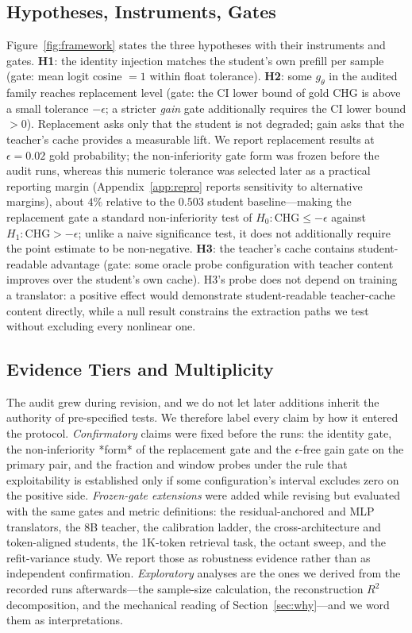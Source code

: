 \documentclass[10pt]{article}
\newcommand{\chg}{\mathrm{CHG}}
\begin{document}
\subsection{Hypotheses, Instruments, Gates}
Figure~\ref{fig:framework} states the three hypotheses with their instruments
and gates. \textbf{H1}: the identity injection matches the student's own
prefill per sample (gate: mean logit cosine $= 1$ within float tolerance).
\textbf{H2}: some $g_\theta$ in the audited family reaches replacement level
(gate: the CI lower bound of gold CHG is above a small tolerance $-\epsilon$; a
stricter \emph{gain} gate additionally requires the CI lower bound $> 0$).
Replacement asks only that the student is not degraded; gain asks that the
teacher's cache provides a measurable lift. We report replacement results at $\epsilon = 0.02$ gold probability; the non-inferiority gate form was frozen before the audit runs, whereas this numeric tolerance was selected later as a practical reporting margin (Appendix~\ref{app:repro} reports sensitivity to alternative margins), about $4\%$ relative to the $0.503$ student baseline---making the replacement gate a
standard non-inferiority test of $H_0\colon \chg \le -\epsilon$ against
$H_1\colon \chg > -\epsilon$; unlike a naive significance test, it does not
additionally require the point estimate to be non-negative. \textbf{H3}: the teacher's cache contains student-readable
advantage (gate: some oracle probe configuration with teacher content
improves over the student's own cache). H3's probe does not depend on training
a translator: a positive effect would demonstrate student-readable
teacher-cache content directly, while a null result constrains the extraction
paths we test without excluding every nonlinear one.

\subsection{Evidence Tiers and Multiplicity}
\label{sec:tiers}
The audit grew during revision, and we do not let later additions inherit the
authority of pre-specified tests. We therefore label every claim by how it
entered the protocol. \emph{Confirmatory} claims were fixed before the runs: the
identity gate, the non-inferiority *form* of the replacement gate and the $\epsilon$-free gain
gate on the primary pair, and the fraction and window probes under the rule that
exploitability is established only if some configuration's interval excludes
zero on the positive side. \emph{Frozen-gate extensions} were added while
revising but evaluated with the same gates and metric definitions: the
residual-anchored and MLP translators, the 8B teacher, the calibration ladder,
the cross-architecture and token-aligned students, the 1K-token retrieval task, the
octant sweep, and the refit-variance study. We report those as robustness
evidence rather than as independent confirmation. \emph{Exploratory} analyses
are the ones we derived from the recorded runs afterwards---the sample-size
calculation, the reconstruction $R^2$ decomposition, and the mechanical reading
of Section~\ref{sec:why}---and we word them as interpretations.
\end{document}

